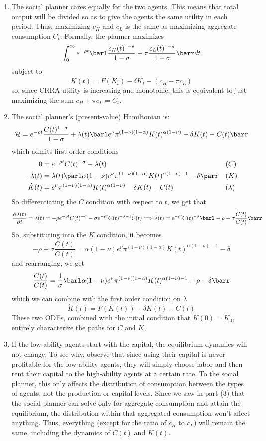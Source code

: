 \documentclass[10pt]{article}
\begin{document}
\begin{enumerate}
	\item The social planner cares equally for the two agents. This means that total output will be divided so as to give the agents the same utility in each period. Thus, maximizing $c_H$ and $c_L$ is the same as maximizing aggregate consumption $C_t$. Formally, the planner maximizes \[\int_0^\infty e^{-\rho t} \barl \frac{c_H(t)^{1-\sigma}}{1-\sigma} + \pi \frac{c_L(t)^{1-\sigma}}{1-\sigma}\barr dt \]subject to\[\dot{K}(t) = F(K_t) - \delta K_t - (c_H - \pi c_L)\]so, since CRRA utility is increasing and monotonic, this is equivalent to just maximizing the sum $c_H + \pi c_L = C_t$.
	\item The social planner's (present-value) Hamiltonian is:\[\mathcal{H} = e^{-\rho t} \frac{C(t)^{1-\sigma}}{1-\sigma} + \lambda(t) \barl e^\nu  \pi^{(1-\nu)(1-\alpha)} K(t)^{\alpha(1-\nu)} - \delta K(t) - C(t)\barr\]which admits first order conditions \begin{align*} 0 &= e^{-\rho t} C(t)^{-\sigma} - \lambda(t) &&(C) \\ -\dot{\lambda}(t) &=\lambda(t) \parl \alpha(1-\nu) e^\nu \pi^{(1-\nu)(1-\alpha)} K(t)^{\alpha(1-\nu)-1} - \delta \parr &&(K) \\ \dot{K}(t) &= e^\nu  \pi^{(1-\nu)(1-\alpha)} K(t)^{\alpha(1-\nu)} - \delta K(t) - C(t) &&(\lambda) \end{align*} So differentiating the $C$ condition with respect to $t$, we get that\[\frac{\partial \lambda(t)}{\partial t} = \dot{\lambda}(t) = -\rho e^{-\rho t}C(t)^{-\sigma} - \sigma e^{-\rho t} C(t)^{-\sigma - 1} \dot{C}(t) \Longrightarrow \dot{\lambda}(t) = e^{-\rho t} C(t)^{-\sigma}\barl -\rho - \sigma \frac{\dot{C}(t)}{C(t)}\barr \] So, substituting into the $K$ condition, it becomes \[ -\rho + \sigma \frac{\dot{C}(t)}{C(t)}=  \alpha(1-\nu) e^\nu \pi^{(1-\nu)(1-\alpha)} K(t)^{\alpha(1-\nu)-1} - \delta \]and rearranging, we get\[\frac{\dot{C}(t)}{C(t)} = \frac{1}{\sigma}\barl \alpha(1-\nu) e^\nu \pi^{(1-\nu)(1-\alpha)} K(t)^{\alpha(1-\nu)-1} + \rho - \delta\barr\]which we can combine with the first order condition on $\lambda$\[\dot{K}(t) = F(K(t)) - \delta K(t) - C(t)\]These two ODEs, combined with the initial condition that $K(0) = K_0$, entirely characterize the paths for $C$ and $K$.
	\item If the low-ability agents start with the capital, the equilibrium dynamics will not change. To see why, observe that since using their capital is never profitable for the low-ability agents, they will simply choose labor and then rent their capital to the high-ability agents at a certain rate. To the social planner, this only affects the distribution of consumption between the types of agents, not the production or capital levels. Since we saw in part (3) that the social planner can solve only for aggregate consumption and attain the equilibrium, the distribution within that aggregated consumption won't affect anything. Thus, everything (except for the ratio of $c_H$ to $c_L$) will remain the same, including the dynamics of $C(t)$ and $K(t)$.
\end{enumerate}
\end{document}
